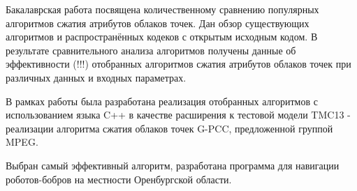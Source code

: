 Бакалаврская работа посвящена количественному сравнению популярных алгоритмов
сжатия атрибутов облаков точек. Дан обзор существующих алгоритмов и
распространённых кодеков с открытым исходным кодом. В результате сравнительного
анализа алгоритмов получены данные об эффективности (!!!) отобранных алгоритмов
сжатия атрибутов облаков точек при различных данных и входных параметрах.

В рамках работы была разработана реализация отобранных алгоритмов с
использованием языка C++ в качестве расширения к тестовой модели TMC13 -
реализации алгоритма сжатия облаков точек G-PCC, предложенной группой MPEG.

Выбран самый эффективный алгоритм, разработана программа для навигации
роботов-бобров на местности Оренбургской области.
